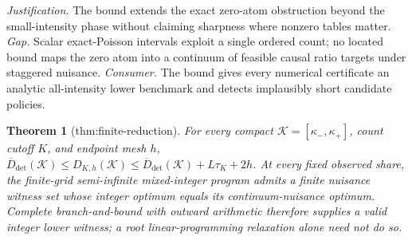 \documentclass{article}
\newtheorem{theorem}{Theorem}
\begin{document}
\par\smallskip\noindent \textit{Justification.} The bound extends the exact zero-atom obstruction beyond the small-intensity phase without claiming sharpness where nonzero tables matter. \textit{Gap.} Scalar exact-Poisson intervals exploit a single ordered count; no located bound maps the zero atom into a continuum of feasible causal ratio targets under staggered nuisance. \textit{Consumer.} The bound gives every numerical certificate an analytic all-intensity lower benchmark and detects implausibly short candidate policies.

\begin{theorem}[thm:finite-reduction]\label{thm:finite-reduction}
For every compact \(\mathcal K=[\kappa_-,\kappa_+]\), count cutoff \(K\), and endpoint mesh \(h\), \(\overline D_{\mathrm{det}}(\mathcal K)\le D_{K,h}(\mathcal K)\le\overline D_{\mathrm{det}}(\mathcal K)+L\tau_K+2h\). At every fixed observed share, the finite-grid semi-infinite mixed-integer program admits a finite nuisance witness set whose integer optimum equals its continuum-nuisance optimum. Complete branch-and-bound with outward arithmetic therefore supplies a valid integer lower witness; a root linear-programming relaxation alone need not do so.
\end{theorem}
\end{document}
